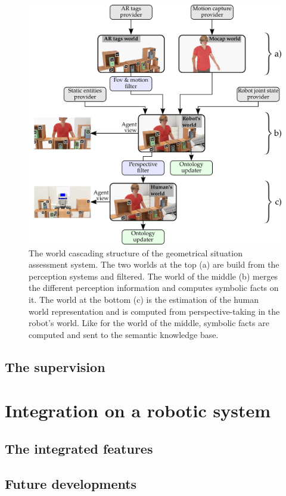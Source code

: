 \begin{figure}[ht!]
\centering
\includegraphics[width=\textwidth]{figures/chapter9/uwds/uwds.png}
\caption{\label{fig:chap9_uwds} The world cascading structure of the geometrical situation assessment system. The two worlds at the top (a) are build from the perception systems and filtered. The world of the middle (b) merges the different perception information and computes symbolic facts on it. The world at the bottom (c) is the estimation of the human world representation and is computed from perspective-taking in the robot's world. Like for the world of the middle, symbolic facts are computed and sent to the semantic knowledge base.}
\end{figure}

\subsection{The supervision}


\section{Integration on a robotic system}

\subsection{The integrated features}

\subsection{Future developments}
